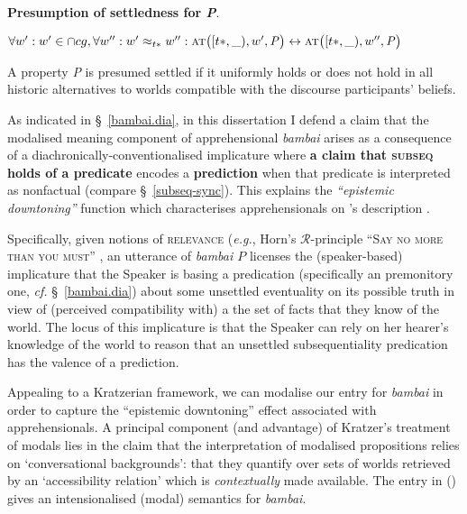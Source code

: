 \ex \textbf{Presumption of settledness for \textit{P}}.


$\forall w^\prime:w^\prime\in\cap cg,\forall w^{\prime\prime}:w^\prime\approx_{t*}w^{\prime\prime}:\\
\textsc{at}\big([t*,\_),w',\mathit{P}\big)\leftrightarrow \textsc{at}\big([t*,\_),w'',\mathit{P}\big)$


A property \textit{P} is presumed settled if it uniformly holds or does not hold in all historic alternatives to worlds compatible with the discourse participants' beliefs.%

\xe

As indicated in \S~\ref{bambai.dia}, in this dissertation I defend a claim that the modalised meaning component of apprehensional \textit{bambai} arises as a consequence of a dia\-chronically-conventionalised implicature where \textbf{a claim that \textsc{subseq} holds of a predicate} encodes a \textbf{prediction} when that predicate is interpreted as nonfactual (compare \S~\ref{subseq-sync}). This explains the \textit{``epistemic downtoning''} function which characterises apprehensionals on \citeauthor{Lichtenberk1995}'s description \citeyearpar{Lichtenberk1995}.

Specifically, given notions of \textsc{relevance} (\textit{e.g.}, Horn's $ \mathcal R $-principle \textsc{``Say no more than you must''} \citeyearpar[13]{Horn1984}, an utterance of \textit{bambai $P$} licenses the (speaker-based) implicature that the Speaker is basing a predication (specifically an premonitory one, \textit{cf.} §~\ref{bambai.dia}) about some unsettled eventuality on its possible truth in view of (perceived compatibility with) a the set of facts that they know of the world. The locus of this implicature is that the Speaker can rely on her hearer's knowledge of the world to reason that an unsettled subsequentiality predication has the valence of a prediction.


Appealing to a Kratzerian framework, we can modalise our entry for \textit{bambai} in order to capture the ``epistemic downtoning'' effect associated with apprehensionals. A principal component (and advantage) of Kratzer's treatment of modals \citeyearpar{Kratzer1977,Kratzer1981,Kratzer2012} lies in the claim that the interpretation of modalised propositions relies on `conversational backgrounds': that they quantify over sets of worlds retrieved by an `accessibility relation' which is \textit{contextually} made available. The entry in (\nextx) gives an intensionalised (modal) semantics for \textit{bambai}.%

